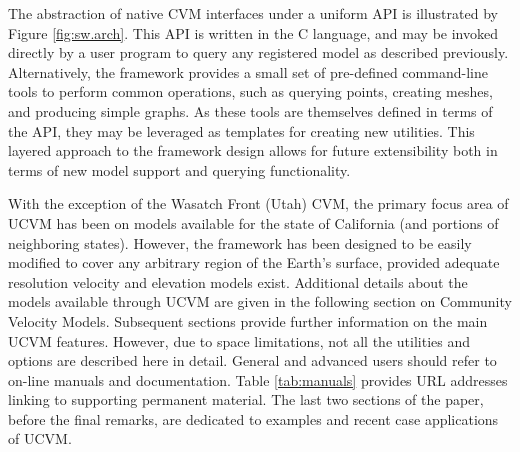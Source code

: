 The abstraction of native CVM interfaces under a uniform API is illustrated by Figure \ref{fig:sw.arch}. This API is written in the C language, and may be invoked directly by a user program to query any registered model as described previously. Alternatively, the framework provides a small set of pre-defined command-line tools to perform common operations, such as querying points, creating meshes, and producing simple graphs. As these tools are themselves defined in terms of the API, they may be leveraged as templates for creating new utilities. This layered approach to the framework design allows for future extensibility both in terms of new model support and querying functionality.

With the exception of the Wasatch Front (Utah) CVM, the primary focus area of UCVM has been on models available for the state of California (and portions of neighboring states). However, the framework has been designed to be easily modified to cover any arbitrary region of the Earth's surface, provided adequate resolution velocity and elevation models exist. Additional details about the models available through UCVM are given in the following section on Community Velocity Models. Subsequent sections provide further information on the main UCVM features. However, due to space limitations, not all the utilities and options are described here in detail. General and advanced users should refer to on-line manuals and documentation. Table \ref{tab:manuals} provides URL addresses linking to supporting permanent material. The last two sections of the paper, before the final remarks, are dedicated to examples and recent case applications of UCVM. 

